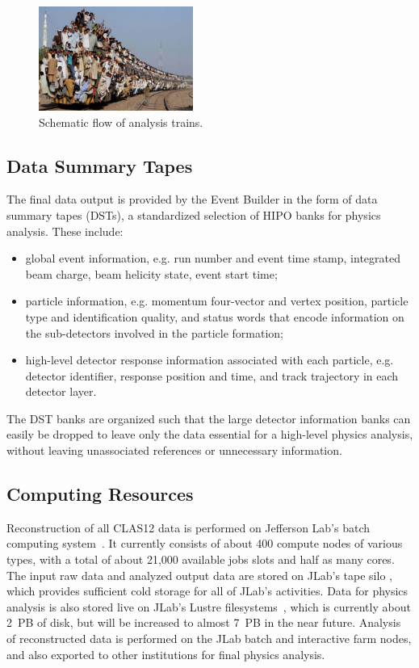 \begin{figure}
    \includegraphics[width=0.45\textwidth,height=0.2\textheight]{pics/train.jpg}
    \caption{Schematic flow of analysis trains.\label{fig:train}}
\end{figure}

\subsection{Data Summary Tapes}
\label{sec:dsts}

The final data output is provided by the Event Builder in the form of data summary tapes (DSTs), a standardized
selection of HIPO banks for physics analysis. These include:

\begin{itemize}
\item global event information, e.g. run number and event time stamp, integrated beam charge, beam helicity state,
  event start time;
\item particle information, e.g. momentum four-vector and vertex position, particle type and identification quality,
  and status words that encode information on the sub-detectors involved in the particle formation;
\item high-level detector response information associated with each particle, e.g. detector identifier, response
  position and time, and track trajectory in each detector layer.
\end{itemize}

\noindent
The DST banks are organized such that the large detector information banks can easily be dropped to leave only
the data essential for a high-level physics analysis, without leaving unassociated references or unnecessary information.

\subsection{Computing Resources}

Reconstruction of all CLAS12 data is performed on Jefferson Lab's batch computing system~\cite{jlab-batch-farm}.
It currently consists of about 400 compute nodes of various types, with a total of about 21,000 available jobs
slots and half as many cores.  The input raw data and analyzed output data are stored on JLab's tape silo
\cite{jlab-tape-silo}, which provides sufficient cold storage for all of JLab's activities.  Data for physics analysis is
also stored live on JLab's Lustre filesystems~\cite{jlab-lustre}, which is currently about 2~PB of disk, but will be
increased to almost 7~PB in the near future. Analysis of reconstructed data is performed on the JLab batch and
interactive farm nodes, and also exported to other institutions for final physics analysis.

